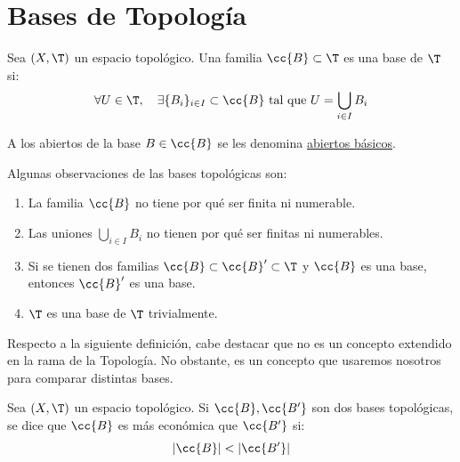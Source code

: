 


\section{Bases de Topología}
\begin{definicion}[Base]
    Sea $(X,\T)$ un espacio topológico. Una familia $\cc{B}\subset \T$ es una base de $\T$ si:
    \begin{equation*}
        \forall U\in \T,\quad \exists \{B_i\}_{i\in I}\subset \cc{B} \text{ tal que } U=\bigcup_{i\in I}B_i
    \end{equation*}

    A los abiertos de la base $B\in \cc{B}$ se les denomina \ul{abiertos básicos}.
\end{definicion}

\begin{observacion}
    Algunas observaciones de las bases topológicas son:
    \begin{enumerate}
        \item La familia $\cc{B}$ no tiene por qué ser finita ni numerable.
        \item Las uniones $\bigcup\limits_{i\in I}B_i$ no tienen por qué ser finitas ni numerables.
        \item Si se tienen dos familias $\cc{B}\subset \cc{B}'\subset \T$ y $\cc{B}$ es una base, entonces $\cc{B}'$ es una base.
        \item $\T$ es una base de $\T$ trivialmente.
    \end{enumerate}
\end{observacion}

Respecto a la siguiente definición, cabe destacar que no es un concepto extendido en
la rama de la Topología. No obstante, es un concepto que usaremos nosotros para comparar
distintas bases.
\begin{definicion}
    Sea $(X,\T)$ un espacio topológico. Si $\cc{B},\cc{B'}$ son dos bases topológicas, se dice que $\cc{B}$ es más económica que $\cc{B'}$ si:
    $$|\cc{B}|<|\cc{B'}|$$
\end{definicion}

